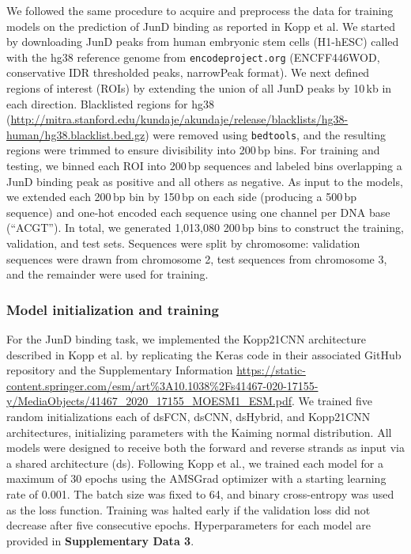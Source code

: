We followed the same procedure to acquire and preprocess the data for training models on the prediction of JunD binding as reported in Kopp et al.\cite{Kopp2020-fw} We started by downloading JunD peaks from human embryonic stem cells (H1-hESC) called with the hg38 reference genome from \texttt{encodeproject.org} (ENCFF446WOD, conservative IDR thresholded peaks, narrowPeak format). We next defined regions of interest (ROIs) by extending the union of all JunD peaks by 10\,kb in each direction. Blacklisted regions for hg38 (\url{http://mitra.stanford.edu/kundaje/akundaje/release/blacklists/hg38-human/hg38.blacklist.bed.gz}) were removed using \texttt{bedtools}\cite{Quinlan2010-ei}, and the resulting regions were trimmed to ensure divisibility into 200\,bp bins. For training and testing, we binned each ROI into 200\,bp sequences and labeled bins overlapping a JunD binding peak as positive and all others as negative. As input to the models, we extended each 200\,bp bin by 150\,bp on each side (producing a 500\,bp sequence) and one-hot encoded each sequence using one channel per DNA base (``ACGT''). In total, we generated 1,013,080 200\,bp bins to construct the training, validation, and test sets. Sequences were split by chromosome: validation sequences were drawn from chromosome 2, test sequences from chromosome 3, and the remainder were used for training.

\subsubsection{Model initialization and training}

For the JunD binding task, we implemented the Kopp21CNN architecture described in Kopp et al. by replicating the Keras code in their associated GitHub repository and the Supplementary Information \url{https://static-content.springer.com/esm/art%3A10.1038%2Fs41467-020-17155-y/MediaObjects/41467_2020_17155_MOESM1_ESM.pdf}. We trained five random initializations each of dsFCN, dsCNN, dsHybrid, and Kopp21CNN architectures, initializing parameters with the Kaiming normal distribution.\cite{He2015-qh} All models were designed to receive both the forward and reverse strands as input via a shared architecture (ds). Following Kopp et al., we trained each model for a maximum of 30 epochs using the AMSGrad optimizer\cite{Phuong2019-dz} with a starting learning rate of 0.001. The batch size was fixed to 64, and binary cross-entropy was used as the loss function. Training was halted early if the validation loss did not decrease after five consecutive epochs. Hyperparameters for each model are provided in \textbf{\textbf{Supplementary Data 3}}.

